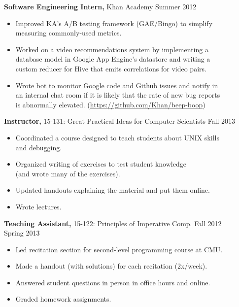 \documentclass[margin]{res}
\begin{document}
\begin{resume}
{\bf Software Engineering Intern,} Khan Academy \hfill Summer 2012
\begin{itemize} \itemsep -2pt %
\item Improved KA's A/B testing framework (GAE/Bingo) to simplify\\
    measuring commonly-used metrics.
\item Worked on a video recommendations system by implementing a \\
    database model in Google App Engine's datastore and writing a \\
    custom reducer for Hive that emits correlations for video pairs.
\item Wrote bot to monitor Google code and Github issues and notify in \\
    an internal chat room if it is likely that the rate of new bug reports \\
    is abnormally elevated.
    (\href{https://github.com/Khan/beep-boop}{https://github.com/Khan/beep-boop})
\end{itemize}

{\bf Instructor,} 15-131: Great Practical Ideas for Computer Scientists \hfill
Fall 2013
\begin{itemize} \itemsep -2pt
  \item Coordinated a course designed to teach students about UNIX skills \\
      and debugging.
  \item Organized writing of exercises to test student knowledge \\
      (and wrote many of the exercises).
  \item Updated handouts explaining the material and put them online.
  \item Wrote lectures.
\end{itemize}

{\bf Teaching Assistant,} 15-122: Principles of Imperative Comp. \hfill
Fall 2012\\ \hphantom{1em} \hfill Spring 2013

\vspace{-1em}\vspace{-1ex}
\begin{itemize} \itemsep -2pt
  \item Led recitation section for second-level programming course at CMU.
  \item Made a handout (with solutions) for each recitation (2x/week).
  \item Answered student questions in person in office hours and online.
  \item Graded homework assignments.
\end{itemize}


\end{resume}
\end{document}

